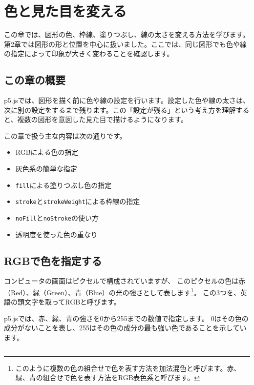 \chapter{色と見た目を変える}
\label{chap:color-and-style}

この章では、図形の色、枠線、塗りつぶし、線の太さを変える方法を学びます。第2章では図形の形と位置を中心に扱いました。ここでは、同じ図形でも色や線の指定によって印象が大きく変わることを確認します。

\section{この章の概要}

p5.jsでは、図形を描く前に色や線の設定を行います。設定した色や線の太さは、次に別の設定をするまで残ります。この「設定が残る」という考え方を理解すると、複数の図形を意図した見た目で描けるようになります。

この章で扱う主な内容は次の通りです。

\begin{itemize}
    \item RGBによる色の指定
    \item 灰色系の簡単な指定
    \item \texttt{fill}による塗りつぶし色の指定
    \item \texttt{stroke}と\texttt{strokeWeight}による枠線の指定
    \item \texttt{noFill}と\texttt{noStroke}の使い方
    \item 透明度を使った色の重なり
\end{itemize}

\section{RGBで色を指定する}

コンピュータの画面はピクセルで構成されていますが、
このピクセルの色は赤（Red）、緑（Green）、青（Blue）の光の強さとして表します\footnote{このように複数の色の組合せで色を表す方法を加法混色と呼びます。赤、緑、青の組合せで色を表す方法をRGB表色系と呼びます。}。
この3つを、英語の頭文字を取ってRGBと呼びます。

p5.jsでは、赤、緑、青の強さを0から255までの数値で指定します。
0はその色の成分がないことを表し、255はその色の成分の最も強い色であることを示しています。

\begin{listing}[htbp]
\inputminted{ts}{typescript-p5/listings/chapter03/rgb-colors.ts}
\caption{RGBで赤、緑、青の円を描く（\texttt{chapter03/rgb-colors.ts}）}
\label{lst:chapter03-rgb-colors}
\end{listing}

